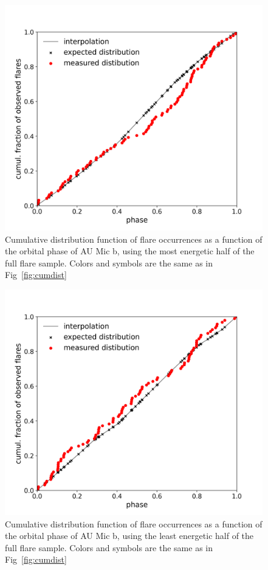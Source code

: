 \documentclass[fleqn,usenatbib,letters]{mnras}%
\begin{document}
\begin{figure}
\includegraphics[width=\hsize]{figures/2021_06_09_AUMic_KS_Test_cumdist_high_energy_half_Both_Sectors_Orbit.png} 
\caption{Cumulative distribution function of flare occurrences as a function of the orbital phase of AU Mic b, using the most energetic half of the full flare sample. Colors and symbols are the same as in Fig~\ref{fig:cumdist}}
\label{fig:cumdisthigh}
\end{figure}
\begin{figure}
\includegraphics[width=\hsize]{figures/2021_06_09_AUMic_KS_Test_cumdist_low_energy_half_Both_Sectors_Orbit.png} 
\caption{Cumulative distribution function of flare occurrences as a function of the orbital phase of AU Mic b, using the least energetic half of the full flare sample. Colors and symbols are the same as in Fig~\ref{fig:cumdist}}
\label{fig:cumdistlow}
\end{figure}
\end{document}

